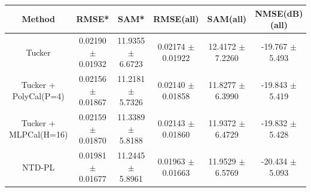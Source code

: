 \begin{tabular}{c|c|c|c|c|c}
    \hline
    Method & RMSE* & SAM* & RMSE(all) & SAM(all) & NMSE(dB)(all) \\
    \hline
    Tucker & 0.02190 $\pm$ 0.01932 & 11.9355 $\pm$ 6.6723 & 0.02174 $\pm$ 0.01922 & 12.4172 $\pm$ 7.2260 & -19.767 $\pm$ 5.493 \\
    Tucker + PolyCal(P=4) & 0.02156 $\pm$ 0.01867 & 11.2181 $\pm$ 5.7326 & 0.02140 $\pm$ 0.01858 & 11.8277 $\pm$ 6.3990 & -19.843 $\pm$ 5.419 \\
    Tucker + MLPCal(H=16) & 0.02159 $\pm$ 0.01870 & 11.3389 $\pm$ 5.8188 & 0.02143 $\pm$ 0.01860 & 11.9372 $\pm$ 6.4729 & -19.832 $\pm$ 5.428 \\
    NTD-PL & 0.01981 $\pm$ 0.01677 & 11.2445 $\pm$ 5.8961 & 0.01963 $\pm$ 0.01663 & 11.9529 $\pm$ 6.5769 & -20.434 $\pm$ 5.093 \\
    \hline
\end{tabular}
